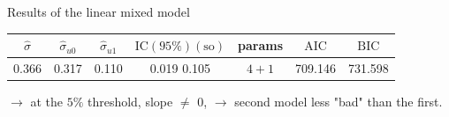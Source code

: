 \documentclass[unknownkeysallowed]{beamer}
\newcommand*{\AIC}{\mathrm{AIC}}
\newcommand*{\BIC}{\mathrm{BIC}}
\begin{document}
\begin{frame}{Results of the linear mixed model}
\vspace{-0.5cm}
\begin{center}
    \begin{tabular}{|c|c|c|c|c|c|c|}
    \hline
         $\hat{\sigma}$ & $\hat{\sigma}_{u0}$ & $\hat{\sigma}_{u1}$ & $\text{IC}(95\%)(\text{so})$ & params & $\AIC$ & $\BIC$ \\
         \hline \hline
         0.366 & 0.317 & 0.110 & 0.019 0.105 & $4+1$ & 709.146 & 731.598 \\
         \hline
    \end{tabular}
\end{center}
\vspace{0.5cm}

$\longrightarrow$  at the $5\%$ threshold, slope $\neq$ $0$,
\newline
$\longrightarrow$ second model less "bad" than the first.
\end{frame}
\end{document}
